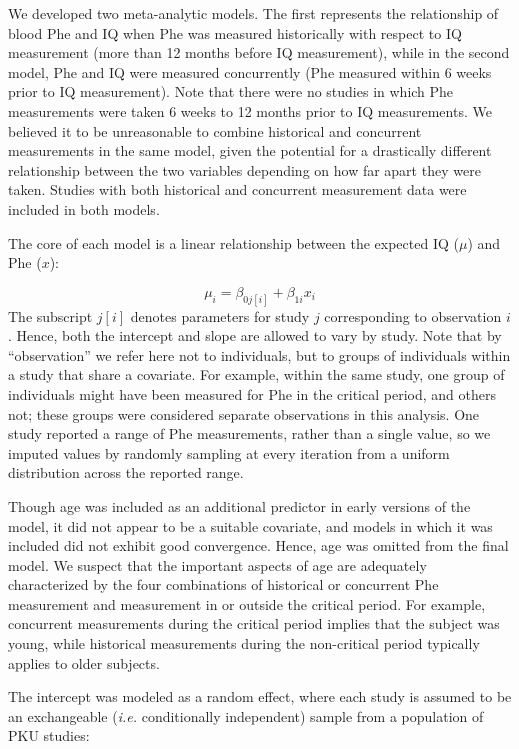 \documentclass{svjour3}                     %
\begin{document}
We developed two meta-analytic models. The first represents the relationship of blood Phe and IQ when Phe was measured historically with respect to IQ measurement (more than 12 months before IQ measurement), while in the second model, Phe and IQ were measured concurrently (Phe measured within 6 weeks prior to IQ measurement). Note that there were no studies in which Phe measurements were taken 6 weeks to 12 months prior to IQ measurements. We believed it to be unreasonable to combine historical and concurrent measurements in the same model, given the potential for a drastically different relationship between the two variables depending on how far apart they were taken. Studies with both historical and concurrent measurement data were included in both models.

The core of each model is a linear relationship between the expected IQ ($\mu$) and Phe ($x$):

\[
    \mu_i = \beta_{0j[i]} + \beta_{1i} x_i
\]
The subscript $j[i]$ denotes parameters for study $j$ corresponding to observation $i$. Hence, both the intercept and slope are allowed to vary by study. Note that by ``observation'' we refer here not to individuals, but to groups of individuals within a study that share a covariate. For example, within the same study, one group of individuals might have been measured for Phe in the critical period, and others not; these groups were considered separate observations in this analysis. One study \citep{Seashore:1985wf} reported a range of Phe measurements, rather than a single value, so we imputed values by randomly sampling at every iteration from a uniform distribution across the reported range.

Though age was included as an additional predictor in early versions of the model, it did not appear to be a suitable covariate, and models in which it was included did not exhibit good convergence. Hence, age was omitted from the final model. We suspect that the important aspects of age are adequately characterized by the four combinations of historical or concurrent Phe measurement and measurement in or outside the critical period. For example, concurrent measurements during the critical period implies that the subject was young, while historical measurements during the non-critical period typically applies to older subjects.

The intercept was modeled as a random effect, where each study is assumed to be an exchangeable (\emph{i.e.} conditionally independent) sample from a population of PKU studies:
\end{document}
